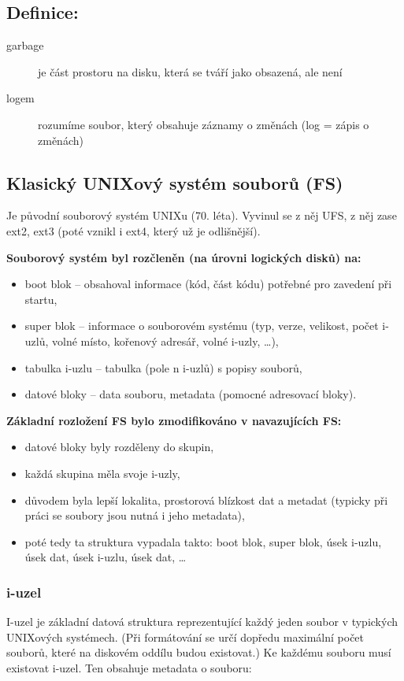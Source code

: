 \documentclass[a4paper, 11pt]{article}
\begin{document}
\subsection*{Definice:}
\begin{description}
\item[garbage] je část prostoru na disku, která se tváří jako obsazená, ale není

\item[logem] rozumíme soubor, který obsahuje záznamy o změnách (log = zápis o změnách)
\end{description}

\newpage

\subsection{Klasický UNIXový systém souborů (FS)}
Je původní souborový systém UNIXu (70. léta). Vyvinul se z něj UFS, z něj zase ext2, ext3 (poté vznikl i ext4, který už je odlišnější).
 
\textbf{Souborový systém byl rozčleněn (na úrovni logických disků) na:}
\begin{itemize}
    \item boot blok -- obsahoval informace (kód, část kódu) potřebné pro zavedení při startu,
    \item super blok -- informace o souborovém systému (typ, verze, velikost, počet i-uzlů, volné místo, kořenový adresář, volné i-uzly, \ldots),
    \item tabulka i-uzlu -- tabulka (pole n i-uzlů) s popisy souborů,
    \item datové bloky -- data souboru, metadata (pomocné adresovací bloky).
\end{itemize}
 
\textbf{Základní rozložení FS bylo zmodifikováno v navazujících FS:}
\begin{itemize}
    \item datové bloky byly rozděleny do skupin, 
    \item každá skupina měla svoje i-uzly,
    \item důvodem byla lepší lokalita, prostorová blízkost dat a metadat (typicky při práci se soubory jsou nutná i jeho metadata),
    \item poté tedy ta struktura vypadala takto: boot blok, super blok, úsek i-uzlu, úsek dat, úsek i-uzlu, úsek dat, \ldots
\end{itemize}

\subsubsection{i-uzel}
I-uzel je základní datová struktura reprezentující každý jeden soubor v typických UNIXových systémech. (Při formátování se určí dopředu maximální počet souborů, které na diskovém oddílu budou existovat.) Ke každému souboru musí existovat i-uzel. Ten obsahuje metadata o souboru: 
\end{document}
